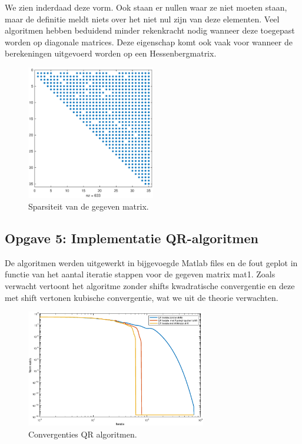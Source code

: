 \documentclass[a4paper]{article}
\newcommand{\opgave}[1]{\subsection{Opgave #1}}
\begin{document}
We zien inderdaad deze vorm. Ook staan er nullen waar ze niet moeten staan, maar de definitie meldt niets over het niet nul zijn van deze elementen. Veel algoritmen hebben beduidend minder rekenkracht nodig wanneer deze toegepast worden op diagonale matrices. Deze eigenschap komt ook vaak voor wanneer de berekeningen uitgevoerd worden op een Hessenbergmatrix.
\begin{figure}[H]
	\begin{center} 
		\includegraphics[width=0.5\textwidth]{spy.eps}
	\end{center}
	\caption{Sparsiteit van de gegeven matrix.}
	\label{fig:spy}
\end{figure}
\newpage

\opgave{5: Implementatie QR-algoritmen}\label{sec:oef5}
De algoritmen werden uitgewerkt in bijgevoegde Matlab files en de fout geplot in functie van het aantal iteratie stappen voor de gegeven matrix mat1. Zoals verwacht vertoont het algoritme zonder shifts kwadratische convergentie en deze met shift vertonen kubische convergentie, wat we uit de theorie verwachten.

\begin{figure}[H]
	\begin{center} 
		\includegraphics[width=0.7\textwidth]{opgave5.eps}
	\end{center}
	\caption{Convergenties QR algoritmen.}
	\label{fig:QR}
\end{figure}
\end{document}
